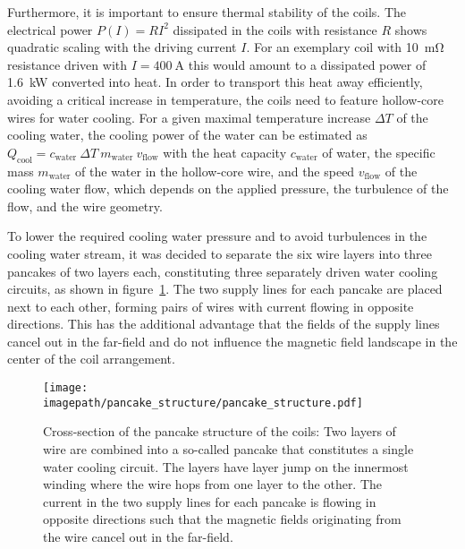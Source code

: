 Furthermore, it is important to ensure thermal stability of the coils. The electrical power $P(I) = RI^2$ dissipated in the coils with resistance $R$ shows quadratic scaling  with the driving current $I$. For an exemplary coil with \SI{10}{\milli\ohm} resistance driven with $I = \SI{400}{\ampere}$ this would amount to a dissipated power of \SI{1.6}{\kilo\watt} converted into heat. In order to transport this heat away efficiently, avoiding a critical increase in temperature, the coils need to feature hollow-core wires for water cooling. For a given maximal temperature increase $\Delta T$ of the cooling water, the cooling power of the water can be estimated as $Q_\text{cool} = c_\text{water} ~ \Delta T ~ m_\text{water} ~ v_\text{flow}$ with the heat capacity $ c_\text{water}$ of water, the specific mass $m_\text{water}$ of the water in the hollow-core wire, and the speed $v_\text{flow}$ of the cooling water flow, which depends on the applied pressure, the turbulence of the flow, and the wire geometry.

To lower the required cooling water pressure and to avoid turbulences in the cooling water stream, it was decided to separate the six wire layers into three pancakes of two layers each, constituting three separately driven water cooling circuits, as shown in figure~\ref{fig:pancake_structure}. The two supply lines for each pancake are placed next to each other, forming pairs of wires with current flowing in opposite directions. This has the additional advantage that the fields of the supply lines cancel out in the far-field and do not influence the magnetic field landscape in the center of the coil arrangement.

\begin{figure}
    \centering
    \texttt{[image: \\imagepath/pancake\_structure/pancake\_structure.pdf]}
    \caption{Cross-section of the pancake structure of the coils: Two layers of wire are combined into a so-called pancake that constitutes a single water cooling circuit. The layers have layer jump on the innermost winding where the wire hops from one layer to the other. The current in the two supply lines for each pancake is flowing in opposite directions such that the magnetic fields originating from the wire cancel out in the far-field.}
    \label{fig:pancake_structure}
\end{figure}

